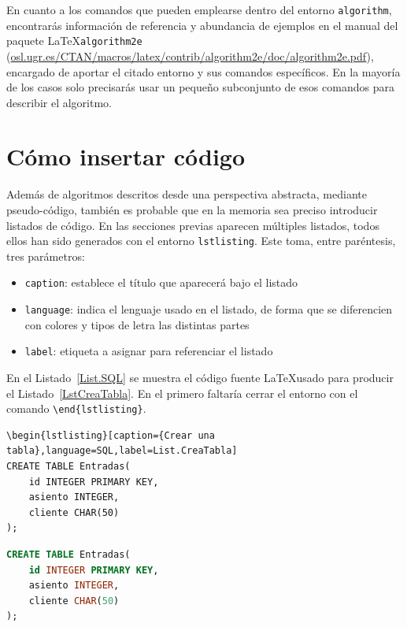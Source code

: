 En cuanto a los comandos que pueden emplearse dentro del entorno \verb|algorithm|, encontrarás información de referencia y abundancia de ejemplos en el manual del paquete \LaTeX \texttt{algorithm2e} (\url{osl.ugr.es/CTAN/macros/latex/contrib/algorithm2e/doc/algorithm2e.pdf}), encargado de aportar el citado entorno y sus comandos específicos. En la mayoría de los casos solo precisarás usar un pequeño subconjunto de esos comandos para describir el algoritmo.

\section{Cómo insertar código}

Además de algoritmos descritos desde una perspectiva abstracta, mediante pseudo-código, también es probable que en la memoria sea preciso introducir listados de código. En las secciones previas aparecen múltiples listados, todos ellos han sido generados con el entorno \verb|lstlisting|. Este toma, entre paréntesis, tres parámetros:

\begin{itemize}
    \item \texttt{caption}: establece el título que aparecerá bajo el listado
    \item \texttt{language}: indica el lenguaje usado en el listado, de forma que se diferencien con colores y tipos de letra las distintas partes
    \item \texttt{label}: etiqueta a asignar para referenciar el listado
\end{itemize}

En el Listado~\ref{List.SQL} se muestra el código fuente \LaTeX usado para producir el Listado~\ref{LstCreaTabla}. En el primero faltaría cerrar el entorno con el comando \verb*|\end{lstlisting}|.

\begin{lstlisting}[caption={Fuente LaTeX que genera el listado en lenguaje SQL},language={[LaTeX]TeX},label=List.SQL]
\begin{lstlisting}[caption={Crear una tabla},language=SQL,label=List.CreaTabla]
CREATE TABLE Entradas(
    id INTEGER PRIMARY KEY,
    asiento INTEGER,
    cliente CHAR(50)
);
\end{lstlisting}

\begin{lstlisting}[caption={Creación de una tabla con SQL},language=SQL,label=LstCreaTabla]
CREATE TABLE Entradas(
    id INTEGER PRIMARY KEY,
    asiento INTEGER,
    cliente CHAR(50)
);
\end{lstlisting}

